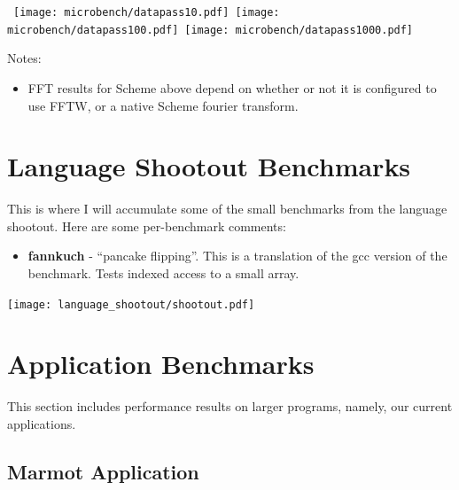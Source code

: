 \documentclass{article}
\begin{document}
\begin{center}
\hbox{
\texttt{[image: microbench/datapass10.pdf]}
\texttt{[image: microbench/datapass100.pdf]}
\texttt{[image: microbench/datapass1000.pdf]}
}
\end{center}

Notes:
\begin{itemize}
\item FFT results for Scheme above depend on whether or not it is
  configured to use FFTW, or a native Scheme fourier transform.
\end{itemize}



\section{Language Shootout Benchmarks}

This is where I will accumulate some of the small benchmarks from the
language shootout.  Here are some per-benchmark comments:

\begin{itemize}
\item {\bf fannkuch} - ``pancake flipping''.  This is a translation of the
  gcc version of the benchmark.  Tests indexed access to a small array.
\end{itemize}

\begin{center}
\texttt{[image: language\_shootout/shootout.pdf]}
\end{center}



\section{Application Benchmarks}

This section includes performance results on larger programs, namely, our
current applications.  

\subsection{Marmot Application}
\end{document}
